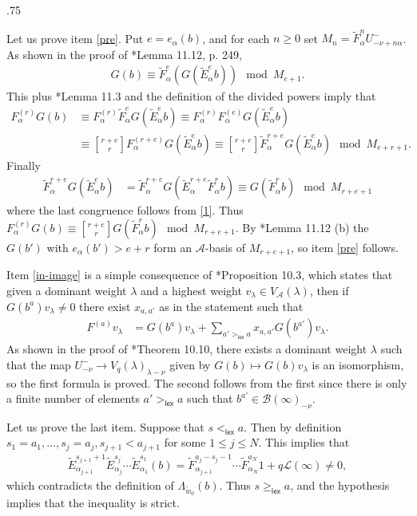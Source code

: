 \documentclass[11pt,fleqn]{article}
\makeatletter
\renewenvironment{proof}[1][\textit{Proof}]{\par
  \pushQED{\qed}%
  \normalfont \topsep.75\paraskip\relax
  \trivlist
  \item[\hskip\labelsep
        \itshape
    #1\@addpunct{.}]\ignorespaces
}{%
  \popQED\endtrivlist\@endpefalse
}
\renewcommand\to{\longrightarrow}
\newcommand\qbinom[2]{\genfrac{[}{]}{0pt}{0}{#1}{#2}}
\newcommand\A{\mathcal A}
\newcommand\B{\mathcal B}
\renewcommand\L{\mathcal L}
\newcommand\lex{\mathsf{lex}}
\makeatother
\begin{document}
\begin{proof}
Let us prove item \ref{pre}. Put $e = e_\alpha(b)$, and for each $n \geq 0$
set $M_{n} = \tilde F_\alpha^{n}U^-_{-\nu+n\alpha}$. As shown in the proof
of \cite{Jan}*{Lemma 11.12, p. 249}, 
\begin{align}
\label{1}
G(b) 
	\equiv \tilde F_\alpha^e(G(\tilde E_\alpha^e b))
	\mod M_{e+1}.
\end{align}
This plus \cite{Jan}*{Lemma 11.3} and the definition of the divided powers 
imply that
\begin{align*}
F_\alpha^{(r)} G(b) 
	&\equiv F_\alpha^{(r)} \tilde F_\alpha^{e} G(\tilde E_\alpha^e b) 
	\equiv F_\alpha^{(r)} F_\alpha^{(e)} G(\tilde E_\alpha^e b) \\
	&\equiv \qbinom{r+e}{r} F_\alpha^{(r+e)} G(\tilde E_\alpha^e b) 
	\equiv \qbinom{r+e}{r} \tilde F_\alpha^{r+e} G(\tilde E_\alpha^e b) 
	\mod M_{e+r+1}.
\end{align*}
Finally
\begin{align*}
\tilde F_\alpha^{r+e} G(\tilde E_\alpha^e b)
	&= \tilde F_\alpha^{r+e} G(\tilde E_\alpha^{r+e} \tilde F_\alpha^r b)
	\equiv G(\tilde F_\alpha^r b) \mod M_{r+e+1}
\end{align*}
where the last congruence follows from \ref{1}. Thus $F_\alpha^{(r)}G(b) 
\equiv \qbinom{r+e}{r} G(\tilde F_\alpha^rb) \mod M_{r+e+1}$. By 
\cite{Jan}*{Lemma 11.12 (b)} the $G(b')$ with $e_\alpha(b') > e+r$ form
an $\A$-basis of $M_{r+e+1}$, so item \ref{pre} follows.

Item \ref{in-image} is a simple consequence of \cite{Lit}*{Proposition 10.3},
which states that given a dominant weight $\lambda$ and a highest weight 
$v_\lambda \in V_\A(\lambda)$, then if $G(b^a) v_{\lambda} \neq 0$ there exist 
$x_{a,a'}$ as in the statement such that
\begin{align*}
F^{(a)}v_\lambda
  &= G(b^a)v_\lambda + \sum_{a' >_{\lex} a} x_{a,a'} G(b^{a'})v_\lambda.
\end{align*}
As shown in the proof of \cite{Jan}*{Theorem 10.10}, there exists a dominant
weight $\lambda$ such that the map $U^-_{-\nu} \to V_q(\lambda)_{\lambda - 
\nu}$ given by $G(b) \mapsto G(b)v_\lambda$ is an isomorphism, so the first 
formula is proved. The second follows from the first since there is only a 
finite number of elements $a' >_{\lex} a$ such that $b^{a'} \in 
\B(\infty)_{-\nu}$. 

Let us prove the last item. Suppose that $s <_\lex a$. Then by definition 
$s_1 = a_1, \ldots, s_j = a_j, s_{j+1} < a_{j+1}$ for some $1 \leq j \leq N$. 
This implies that 
\begin{align*}
	\tilde E_{\alpha_{j+1}}^{s_{j+1}+1} 
		\tilde E_{\alpha_j}^{s_j} \cdots \tilde E_{\alpha_1}^{s_1}(b) 
		= \tilde F_{\alpha_{j+1}}^{a_j-s_j-1} \cdots \tilde 
			F_{\alpha_N}^{a_N}1 + q\L(\infty) \neq 0,
\end{align*}
which contradicts the definition of $\Lambda_{\tilde w_0}(b)$. Thus $s 
\geq_{\lex} a$, and the hypothesis implies that the inequality is strict.


\end{proof}
\end{document}
